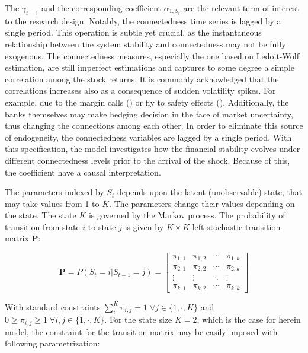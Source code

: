 \documentclass[12pt]{article}
\begin{document}
The $\gamma_{t-1}$ and the corresponding coefficient $\alpha_{1, S_t}$ are the relevant term of interest to the research design. Notably, the connectedness time series is lagged by a single period. This operation is subtle yet crucial, as the instantaneous relationship between the system stability and connectedness may not be fully exogenous. The connectedness measures, especially the one based on Ledoit-Wolf estimation, are still imperfect estimations and captures to some degree a simple correlation among the stock returns. It is commonly acknowledged that the correlations increases also as a consequence of sudden volatility spikes. For example, due to the margin calls (\citet{kahraman19}) or fly to safety effects (\citet{baele19}). Additionally, the banks themselves may make hedging decision in the face of market uncertainty, thus changing the connections among each other. In order to eliminate this source of endogeneity, the connectedness variables are lagged by a single period. With this specification, the model investigates how the financial stability evolves under different connectedness levels prior to the arrival of the shock. Because of this, the coefficient have a causal interpretation. 

The parameters indexed by $S_t$ depends upon the latent (unobservable) state, that may take values from 1 to $K$. The parameters change their values depending on the state. The state $K$ is governed by the Markov process. The probability of transition from state $i$ to state $j$ is given by $K \times K$ left-stochastic transition matrix $\mathbf{P}$:

\begin{equation}
	\mathbf{P} = P(S_t = i | S_{t-1} = j) = 
	\begin{bmatrix}
		\pi_{1,1} & \pi_{1,2} & \cdots & \pi_{1,k} \\
		\pi_{2,1} & \pi_{2,2} & \cdots & \pi_{2,k} \\
		\vdots  & \vdots  & \ddots & \vdots  \\
		\pi_{k,1} & \pi_{k,2} & \cdots & \pi_{k,k} 
	\end{bmatrix}
\end{equation}

With standard constraints $\sum_{i}^{K} \pi_{i,j} = 1 \; \forall j \in \{1,\cdot, K\}$ and $0 \geq \pi_{i,j} \geq 1 \; \forall i,j \in \{1,\cdot, K\}$. For the state size $K=2$, which is the case for herein model, the constraint for the transition matrix may be easily imposed with following parametrization:
\end{document}
